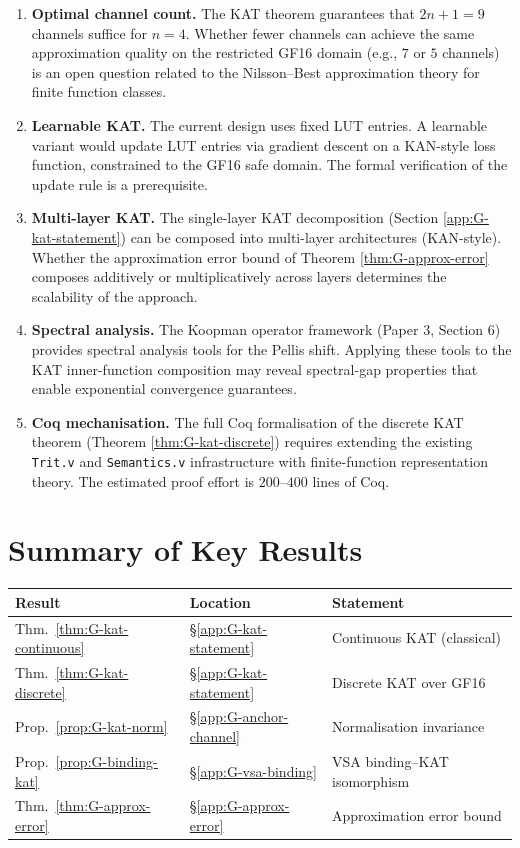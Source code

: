 \begin{enumerate}
\item \textbf{Optimal channel count.} The KAT theorem guarantees that
$2n+1 = 9$ channels suffice for $n = 4$. Whether fewer channels can
achieve the same approximation quality on the restricted GF16 domain
(e.g., $7$ or $5$ channels) is an open question related to the
Nilsson--Best approximation theory for finite function classes.

\item \textbf{Learnable KAT.} The current design uses fixed LUT
entries. A learnable variant would update LUT entries via gradient
descent on a KAN-style loss function, constrained to the GF16 safe
domain. The formal verification of the update rule is a prerequisite.

\item \textbf{Multi-layer KAT.} The single-layer KAT decomposition
(Section \ref{app:G-kat-statement}) can be composed into multi-layer
architectures (KAN-style). Whether the approximation error bound of
Theorem \ref{thm:G-approx-error} composes additively or multiplicatively
across layers determines the scalability of the approach.

\item \textbf{Spectral analysis.} The Koopman operator framework (Paper
3, Section 6) provides spectral analysis tools for the Pellis shift.
Applying these tools to the KAT inner-function composition may reveal
spectral-gap properties that enable exponential convergence guarantees.

\item \textbf{Coq mechanisation.} The full Coq formalisation of the
discrete KAT theorem (Theorem \ref{thm:G-kat-discrete}) requires
extending the existing \texttt{Trit.v} and \texttt{Semantics.v}
infrastructure with finite-function representation theory. The estimated
proof effort is $200$--$400$ lines of Coq.
\end{enumerate}

\section{Summary of Key Results}
\label{app:G-summary}

\begin{longtable}[]{@{}llp{6cm}@{}}
\toprule\noalign{}
Result & Location & Statement \\
\midrule\noalign{}
\endhead
\bottomrule\noalign{}
\endlastfoot
Thm.~\ref{thm:G-kat-continuous} & \S\ref{app:G-kat-statement} & Continuous KAT (classical) \\
Thm.~\ref{thm:G-kat-discrete} & \S\ref{app:G-kat-statement} & Discrete KAT over GF16 \\
Prop.~\ref{prop:G-kat-norm} & \S\ref{app:G-anchor-channel} & Normalisation invariance \\
Prop.~\ref{prop:G-binding-kat} & \S\ref{app:G-vsa-binding} & VSA binding--KAT isomorphism \\
Thm.~\ref{thm:G-approx-error} & \S\ref{app:G-approx-error} & Approximation error bound \\
\end{longtable}


